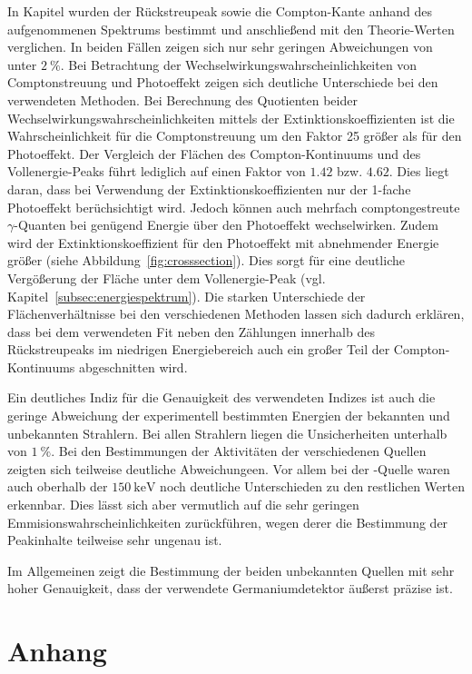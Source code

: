 In Kapitel \label{subsubsec:P} wurden der Rückstreupeak sowie die Compton-Kante
anhand des aufgenommenen Spektrums bestimmt und anschließend mit den Theorie-Werten
verglichen. In beiden Fällen zeigen sich nur sehr geringen Abweichungen von
unter $\SI{2}{\percent}$.
Bei Betrachtung der Wechselwirkungswahrscheinlichkeiten von Comptonstreuung und
Photoeffekt zeigen sich deutliche Unterschiede
bei den verwendeten Methoden. Bei Berechnung des Quotienten beider
Wechselwirkungswahrscheinlichkeiten mittels der Extinktionskoeffizienten
ist die Wahrscheinlichkeit für die Comptonstreuung um den Faktor 25 größer als
für den Photoeffekt. Der Vergleich der Flächen des Compton-Kontinuums und des
Vollenergie-Peaks führt lediglich auf einen Faktor von $\num{1.42}$
bzw. $\num{4.62}$. Dies liegt daran, dass bei Verwendung der Extinktionskoeffizienten
nur der 1-fache Photoeffekt berüchsichtigt wird. Jedoch können auch mehrfach
comptongestreute $\gamma$-Quanten bei genügend Energie über den Photoeffekt wechselwirken.
Zudem wird der Extinktionskoeffizient für den Photoeffekt mit abnehmender Energie
größer (siehe Abbildung~\ref{fig:crosssection}). Dies sorgt für eine deutliche
Vergößerung der Fläche unter dem Vollenergie-Peak (vgl. Kapitel~\ref{subsec:energiespektrum}).
Die starken Unterschiede der Flächenverhältnisse bei den verschiedenen Methoden
lassen sich dadurch erklären, dass bei dem verwendeten Fit neben den Zählungen
innerhalb des Rückstreupeaks im niedrigen Energiebereich auch ein großer
Teil der Compton-Kontinuums abgeschnitten wird.

Ein deutliches Indiz für die Genauigkeit des verwendeten Indizes ist auch die
geringe Abweichung der experimentell bestimmten Energien der bekannten und
unbekannten Strahlern. Bei allen Strahlern liegen die Unsicherheiten unterhalb
von $\SI{1}{\percent}$. Bei den Bestimmungen der Aktivitäten der verschiedenen
Quellen zeigten sich teilweise deutliche Abweichungeen. Vor allem bei der
-Quelle waren auch oberhalb der $\SI{150}{\kilo\eV}$ noch deutliche
Unterschieden zu den restlichen Werten erkennbar. Dies lässt sich aber vermutlich
auf die sehr geringen Emmisionswahrscheinlichkeiten zurückführen, wegen derer die
Bestimmung der Peakinhalte teilweise sehr ungenau ist.

Im Allgemeinen zeigt die Bestimmung der beiden unbekannten Quellen mit sehr hoher
Genauigkeit, dass der verwendete Germaniumdetektor äußerst präzise ist.

\newpage
\section{Anhang}

